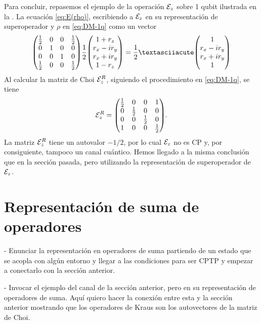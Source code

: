 Para concluir, repasemos el ejemplo de la operación $\mathcal{E}_z$ sobre 1 qubit
ilustrada en la . La ecuación \eqref{eq:E(rho)}, 
escribiendo a $\mathcal{E}_z$ en su representación de superoperador y $\rho$ en 
\eqref{eq:DM-1q} como un vector
\begin{align}
\mqty(
\frac{1}{2} & 0 & 0 & \frac{1}{2} \\
0 & 1 & 0 & 0 \\
0 & 0 & 1 & 0 \\
\frac{1}{2} & 0 & 0 & \frac{1}{2} \\
)
\frac{1}{2}
\mqty(
1+r_z\\r_x-ir_y\\r_x+ir_y\\1-r_z
)
=
\frac{1}{2}´
\mqty(
1\\r_x-ir_y\\r_x+ir_y\\1
)
\end{align}
Al calcular la matriz de Choi $\mathcal{E}_z^{R}$, siguiendo el procedimiento
en \eqref{eq:DM-1q}, se tiene
\begin{align}
\E_z^R=
\mqty(
\frac{1}{2} & 0 & 0 & 1 \\
0 & \frac{1}{2} & 0 & 0 \\
0 & 0 & \frac{1}{2} & 0 \\
1 & 0 & 0 & \frac{1}{2} 
).
\end{align}
La matriz $\mathcal{E}_z^R$ tiene un autovalor $-1/2$, por lo cual $\mathcal{E}_z$ no es CP y,
por consiguiente, tampoco un canal cuántico. Hemos llegado a la misma 
conclusión que en la sección pasada, pero utilizando la representación 
de superoperador de $\mathcal{E}_z$.
\section{Representación de suma de operadores}
- Enunciar la representación en operadores de suma partiendo de un 
estado que se acopla con algún entorno
y llegar a las condiciones para ser CPTP y empezar a conectarlo
con la sección anterior. 

- Invocar el ejemplo del canal de la sección anterior, pero en su 
representación de operadores de suma. Aquí quiero hacer la conexión 
entre esta y la sección anterior mostrando que los operadores 
de Kraus son los autovectores de la matriz de Choi. 

